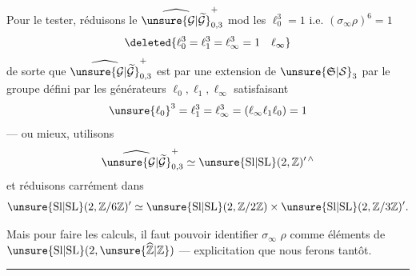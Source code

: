 Pour le tester, réduisons le 
$\widehat{\unsure{\mathcal G|\widetilde{\mathcal G}}}_{0,3}^{+}$
mod les 
$\ell_0^3=1$ i.e. $(\sigma_\infty\rho)^6=1$
\[
\deleted{\ell_0^3=\ell_1^3=\ell_\infty^3=1\quad\ell_\infty}
\]
de sorte que $\widehat{\unsure{\mathcal G|\widetilde{\mathcal G}}}_{0,3}^{+}$
est  par une extension de $\unsure{\mathfrak S|\mathcal S}_3$
par le groupe défini par les générateurs $\ell_0,\ell_1,\ell_\infty$ satisfaisant
\[
\unsure{\ell_0}^3=\ell_1^3=\ell_\infty^3=(\ell_\infty\ell_1\ell_0)=1
\]
--- ou mieux, utilisons
\[
\widehat{\unsure{\mathcal G|\widetilde{\mathcal G}}}_{0,3}^{+}
\simeq\unsure{\mathrm{Sl}|\mathrm{SL}}(2,\mathbb Z)^{\prime\,\wedge}
\]
et réduisons carrément dans
\[
\unsure{\mathrm{Sl}|\mathrm{SL}}(2,\mathbb Z/6\mathbb Z)'
\simeq\unsure{\mathrm{Sl}|\mathrm{SL}}(2,\mathbb Z/2\mathbb Z)
\times\unsure{\mathrm{Sl}|\mathrm{SL}}(2,\mathbb Z/3\mathbb Z)'.
\]



Mais pour faire les calculs, il faut pouvoir identifier $\sigma_\infty$
 $\rho$ comme éléments de
$\unsure{\mathrm{Sl}|\mathrm{SL}}(2,\unsure{\widehat{\mathbb Z}|\mathbb Z})$
--- explicitation que nous ferons tantôt.

\begin{center}\rule{2cm}{0.4pt}\end{center}

